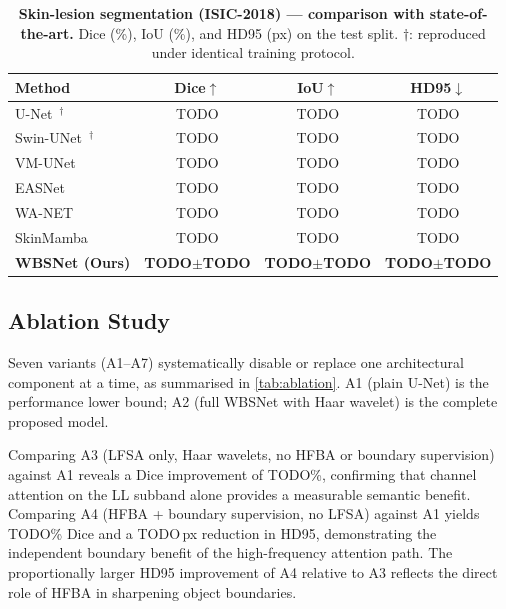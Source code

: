 \documentclass[journal]{IEEEtran}
\begin{document}
\begin{table}[t]
  \centering
  \caption{\textbf{Skin-lesion segmentation (ISIC-2018) --- comparison with
    state-of-the-art.}  Dice (\%), IoU (\%), and HD95 (px) on the test split.
    $\dagger$: reproduced under identical training protocol.}
  \label{tab:sota_skin}
  \begin{tabular}{@{}lccc@{}}
    \toprule
    Method & Dice$\uparrow$ & IoU$\uparrow$ & HD95$\downarrow$ \\
    \midrule
    U-Net~\cite{ronneberger2015unet}$^{\dagger}$  & TODO & TODO & TODO \\
    Swin-UNet~\cite{cao2021swinunet}$^{\dagger}$  & TODO & TODO & TODO \\
    VM-UNet~\cite{ruan2024vmunet}                 & TODO & TODO & TODO \\
    EASNet~\cite{easnet2025}                      & TODO & TODO & TODO \\
    WA-NET~\cite{wanet2025}                       & TODO & TODO & TODO \\
    SkinMamba~\cite{skinmamba2024}                & TODO & TODO & TODO \\
    \midrule
    \textbf{WBSNet (Ours)}
        & \textbf{TODO$\pm$TODO}
        & \textbf{TODO$\pm$TODO}
        & \textbf{TODO$\pm$TODO} \\
    \bottomrule
  \end{tabular}
\end{table}

\subsection{Ablation Study}\label{sec:exp:ablation}

Seven variants (A1--A7) systematically disable or replace one architectural
component at a time, as summarised in \cref{tab:ablation}.
A1 (plain U-Net) is the performance lower bound; A2 (full WBSNet with Haar
wavelet) is the complete proposed model.

Comparing A3 (LFSA only, Haar wavelets, no HFBA or boundary supervision)
against A1 reveals a Dice improvement of TODO\%, confirming that channel
attention on the LL subband alone provides a measurable semantic benefit.
Comparing A4 (HFBA + boundary supervision, no LFSA) against A1 yields
TODO\% Dice and a TODO\,px reduction in HD95, demonstrating the independent
boundary benefit of the high-frequency attention path.
The proportionally larger HD95 improvement of A4 relative to A3 reflects the
direct role of HFBA in sharpening object boundaries.
\end{document}
